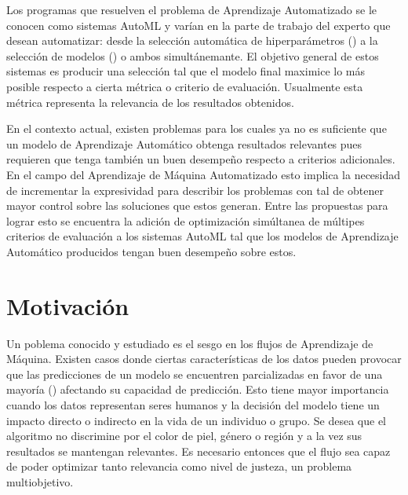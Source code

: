 Los programas que resuelven el problema de Aprendizaje Automatizado se le conocen como sistemas AutoML y var\'ian en la parte de trabajo del experto que desean automatizar: desde la selecci\'on autom\'atica de hiperpar\'ametros (\cite{feurer2019hyperparameter}) a  la selecci\'on de modelos (\cite{thornton2013auto}) o ambos  simult\'anemante. El objetivo general de estos sistemas es producir una selecci\'on tal que el modelo final maximice lo m\'as posible respecto a cierta m\'etrica o criterio de evaluaci\'on. Usualmente esta m\'etrica representa la relevancia de los resultados obtenidos.

En el contexto actual, existen problemas para los cuales ya no es suficiente que un modelo de Aprendizaje Autom\'atico obtenga resultados relevantes pues requieren que tenga tambi\'en un buen desempe\~no respecto a criterios adicionales. En el campo del Aprendizaje de M\'aquina Automatizado esto implica la necesidad de incrementar la expresividad para describir los problemas con tal de obtener mayor control sobre las soluciones que estos generan. Entre las propuestas  para lograr esto se encuentra la adici\'on  de optimizaci\'on sim\'ultanea de m\'ultipes criterios de evaluaci\'on a los sistemas AutoML  tal que los modelos de Aprendizaje Autom\'atico producidos tengan buen desempeño sobre estos.   

\section*{Motivaci\'on}
Un poblema conocido y estudiado es el sesgo en los flujos de Aprendizaje de M\'aquina. Existen casos donde ciertas caracter\'isticas de los datos pueden provocar que las predicciones de un modelo se encuentren parcializadas en favor de una mayor\'ia  (\cite{mehrabi2021survey}) afectando su capacidad de predicci\'on. Esto tiene mayor importancia cuando los datos representan seres humanos y la decisi\'on del modelo tiene un impacto directo o indirecto en la vida de un individuo o grupo. Se desea que el algoritmo no discrimine por el color de piel, g\'enero o regi\'on y a la vez sus resultados se mantengan relevantes. Es necesario entonces que el flujo sea capaz de poder optimizar tanto  relevancia como  nivel de justeza, un problema multiobjetivo.

